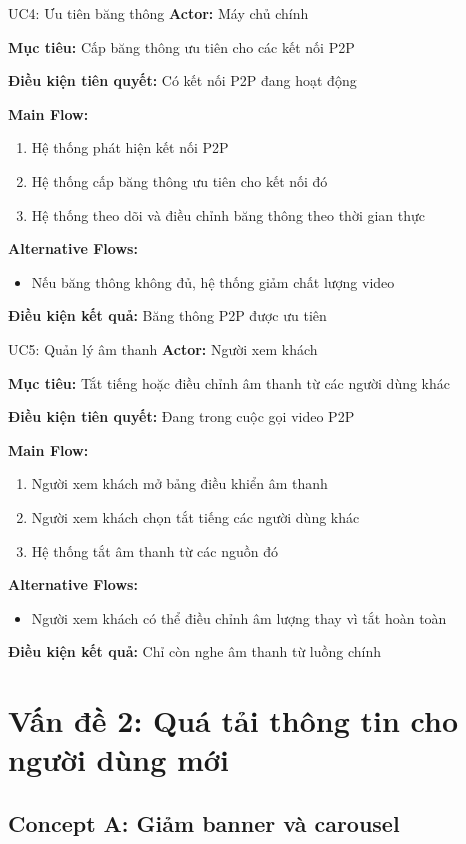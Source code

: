 \documentclass[12pt,a4paper]{article}
\newcommand{\usecasefield}[2]{%
    \textbf{#1:} #2 \par\vspace{2pt}
}
\newenvironment{mainflow}{
    \par\vspace{4pt}
    \textbf{Main Flow:}
    \begin{enumerate}[leftmargin=*, label=\arabic*., itemsep=2pt]
}{
    \end{enumerate}
}
\newenvironment{altflow}{
    \par\vspace{4pt}
    \textbf{Alternative Flows:}
    \begin{itemize}[leftmargin=*, label=\textendash, itemsep=2pt]
}{
    \end{itemize}
}
\begin{document}
\begin{usecase}{UC4: Ưu tiên băng thông}
    \usecasefield{Actor}{Máy chủ chính}
    \usecasefield{Mục tiêu}{Cấp băng thông ưu tiên cho các kết nối P2P}
    \usecasefield{Điều kiện tiên quyết}{Có kết nối P2P đang hoạt động}
    \begin{mainflow}
        \item Hệ thống phát hiện kết nối P2P
        \item Hệ thống cấp băng thông ưu tiên cho kết nối đó
        \item Hệ thống theo dõi và điều chỉnh băng thông theo thời gian thực
    \end{mainflow}
    \begin{altflow}
        \item Nếu băng thông không đủ, hệ thống giảm chất lượng video
    \end{altflow}
    \usecasefield{Điều kiện kết quả}{Băng thông P2P được ưu tiên}
\end{usecase}

\begin{usecase}{UC5: Quản lý âm thanh}
    \usecasefield{Actor}{Người xem khách}
    \usecasefield{Mục tiêu}{Tắt tiếng hoặc điều chỉnh âm thanh từ các người dùng khác}
    \usecasefield{Điều kiện tiên quyết}{Đang trong cuộc gọi video P2P}
    \begin{mainflow}
        \item Người xem khách mở bảng điều khiển âm thanh
        \item Người xem khách chọn tắt tiếng các người dùng khác
        \item Hệ thống tắt âm thanh từ các nguồn đó
    \end{mainflow}
    \begin{altflow}
        \item Người xem khách có thể điều chỉnh âm lượng thay vì tắt hoàn toàn
    \end{altflow}
    \usecasefield{Điều kiện kết quả}{Chỉ còn nghe âm thanh từ luồng chính}
\end{usecase}

\section{Vấn đề 2: Quá tải thông tin cho người dùng mới}

\subsection{Concept A: Giảm banner và carousel}
\end{document}
